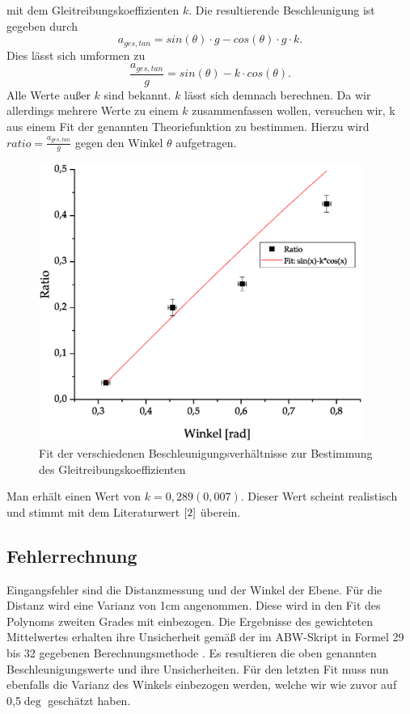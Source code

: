 \documentclass{article}
\begin{document}
mit dem Gleitreibungskoeffizienten $k$.
Die resultierende Beschleunigung ist gegeben durch
\begin{equation}
a_{ges,tan} = sin(\theta) \cdot g - cos(\theta) \cdot g \cdot k.
\end{equation}
Dies lässt sich umformen zu
\begin{equation}
\frac{a_{ges,tan}}{g} = sin(\theta) - k \cdot cos(\theta). 
\end{equation}
Alle Werte außer $k$ sind bekannt. $k$ lässt sich demnach berechnen. Da wir allerdings mehrere Werte zu einem $k$ zusammenfassen wollen, versuchen wir, k aus einem Fit der genannten Theoriefunktion zu bestimmen.
Hierzu wird $ratio = \frac{a_{ges,tan}}{g}$ gegen den Winkel $\theta$ aufgetragen.
\begin{figure}[H]
\centering
\includegraphics[width=300pt]{FitGleitreibung.eps}
\caption{Fit der verschiedenen Beschleunigungsverhältnisse zur Bestimmung des Gleitreibungskoeffizienten}
\end{figure}
Man erhält einen Wert von $k = 0,289(0,007)$.
Dieser Wert scheint realistisch und stimmt mit dem Literaturwert $\cite{2}$ überein.
\subsection{Fehlerrechnung}
Eingangsfehler sind die Distanzmessung und der Winkel der Ebene. Für die Distanz wird eine Varianz von 1cm angenommen. Diese wird in den Fit des Polynoms zweiten Grades mit einbezogen. Die Ergebnisse des gewichteten Mittelwertes erhalten ihre Unsicherheit gemäß der im ABW-Skript in Formel 29 bis 32 \cite{3} gegebenen Berechnungsmethode . Es resultieren die oben genannten Beschleunigungswerte und ihre Unsicherheiten. Für den letzten Fit muss nun ebenfalls die Varianz des Winkels einbezogen werden, welche wir wie zuvor auf 0,5$\deg$ geschätzt haben.
\end{document}
